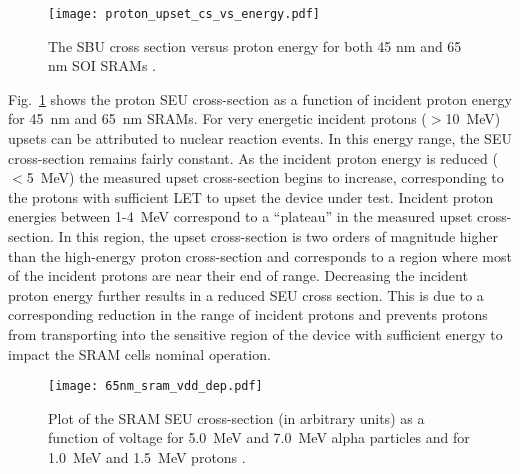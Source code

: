 \begin{figure}[htbp]
    \begin{center}
        \texttt{[image: proton\_upset\_cs\_vs\_energy.pdf]}
    \end{center}
    \caption[The SBU cross section versus proton energy for both 45 nm and 65 nm SOI SRAMs.]{The SBU cross section versus proton energy for both 45 nm and 65 nm SOI SRAMs \cite{Heidel:2009vx}.}
    \label{fig:seu_cs_vs_p_energy}
\end{figure}

Fig.~\ref{fig:seu_cs_vs_p_energy} shows the proton SEU cross-section as a function of incident proton energy for 45~nm and 65~nm SRAMs.
For very energetic incident protons ($>$10~MeV) upsets can be attributed to nuclear reaction events.
In this energy range, the SEU cross-section remains fairly constant.
As the incident proton energy is reduced ($<$5~MeV) the measured upset cross-section begins to increase, corresponding to the protons with sufficient LET to upset the device under test.
Incident proton energies between 1-4~MeV correspond to a ``plateau'' in the measured upset cross-section.
In this region, the upset cross-section is two orders of magnitude higher than the high-energy proton cross-section and corresponds to a region where most of the incident protons are near their end of range.
Decreasing the incident proton energy further results in a reduced SEU cross section.
This is due to a corresponding reduction in the range of incident protons and prevents protons from transporting into the sensitive region of the device with sufficient energy to impact the SRAM cells nominal operation.

\begin{figure}[htbp]
    \begin{center}
        \texttt{[image: 65nm\_sram\_vdd\_dep.pdf]}
    \end{center}
    \caption[Plot of the SRAM SEU cross-section (in arbitrary units) as a function of voltage for 5.0~MeV and 7.0~MeV alpha particles and for 1.0~MeV and 1.5~MeV protons.]{Plot of the SRAM SEU cross-section (in arbitrary units) as a function of voltage for 5.0~MeV and 7.0~MeV alpha particles and for 1.0~MeV and 1.5~MeV protons \cite{Rodbell:2007vl}.}
    \label{fig:seu_cs_vs_appl_bias_protons}
\end{figure}

